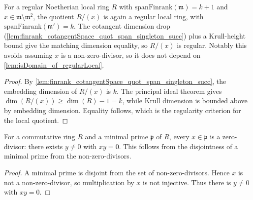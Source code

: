 \begin{lemma}\leanok
  \label{lem:regularLocal_quotient_isRegularLocal_of_notMemSq}
  For a regular Noetherian local ring \(R\) with \(\text{spanFinrank}(\mathfrak m) = k + 1\)
  and \(x \in \mathfrak m \setminus \mathfrak m^2\), the quotient \(R / (x)\) is again a regular
  local ring, with \(\text{spanFinrank}(\mathfrak m') = k\). The cotangent dimension drop
  (\cref{lem:finrank_cotangentSpace_quot_span_singleton_succ}) plus a Krull-height bound
  give the matching dimension equality, so \(R/(x)\) is regular. Notably this avoids
  assuming \(x\) is a non-zero-divisor, so it does not depend on
  \cref{lem:isDomain_of_regularLocal}.
\end{lemma}
\begin{proof}

\leanok
  By \cref{lem:finrank_cotangentSpace_quot_span_singleton_succ},
  the embedding dimension of \(R/(x)\) is \(k\). The principal ideal
  theorem gives \(\dim(R/(x))\geq\dim(R)-1=k\), while Krull dimension is
  bounded above by embedding dimension. Equality follows, which is the
  regularity criterion for the local quotient.
\end{proof}

\begin{lemma}\leanok
  \label{lem:exists_ne_zero_mul_eq_zero_of_mem_minimalPrimes}
  For a commutative ring \(R\) and a minimal prime \(\mathfrak p\) of \(R\), every
  \(x \in \mathfrak p\) is a zero-divisor: there exists \(y \neq 0\) with \(x y = 0\). This
  follows from the disjointness of a minimal prime from the non-zero-divisors.
\end{lemma}
\begin{proof}

\leanok
  A minimal prime is disjoint from the set of non-zero-divisors. Hence
  \(x\) is not a non-zero-divisor, so multiplication by \(x\) is not
  injective. Thus there is \(y\neq0\) with \(xy=0\).
\end{proof}

